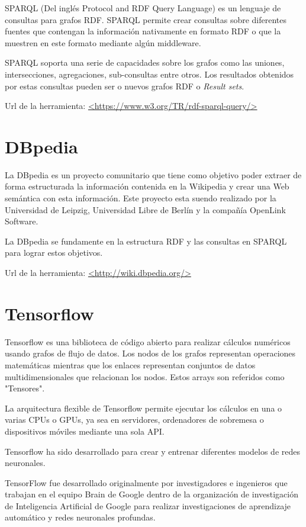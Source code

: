 SPARQL (Del inglés Protocol and RDF Query Language) es un lenguaje de consultas para grafos RDF. SPARQL permite crear consultas sobre diferentes fuentes que contengan la información nativamente en formato RDF o que la muestren en este formato mediante algún middleware.\cite{SPARQL}

SPARQL soporta una serie de capacidades sobre los grafos como las uniones, intersecciones, agregaciones, sub-consultas entre otros. Los resultados obtenidos por estas consultas pueden ser o nuevos grafos RDF o \textit{Result sets}.

Url de la herramienta: \url{<https://www.w3.org/TR/rdf-sparql-query/>}


\section{DBpedia}

La DBpedia es un proyecto comunitario que tiene como objetivo poder extraer de forma estructurada la información contenida en la Wikipedia y crear una Web semántica con esta información. Este proyecto esta suendo realizado por la Universidad de Leipzig, Universidad Libre de Berlín y la compañía OpenLink Software. \cite{wiki:DBpedia}

La DBpedia se fundamente en la estructura RDF y las consultas en SPARQL para lograr estos objetivos.

Url de la herramienta: \url{<http://wiki.dbpedia.org/>}

\section{Tensorflow}

Tensorflow es una biblioteca de código abierto para realizar cálculos numéricos usando grafos de flujo de datos. Los nodos de los grafos representan operaciones matemáticas mientras que los enlaces representan conjuntos de datos multidimensionales que relacionan los nodos. Estos arrays son referidos como "Tensores".\cite{wiki:Tensorflow}

La arquitectura flexible de Tensorflow permite ejecutar los cálculos en una o varias CPUs o GPUs, ya sea en servidores, ordenadores de sobremesa o dispositivos móviles mediante una sola API.

Tensorflow ha sido desarrollado para crear y entrenar diferentes modelos de redes neuronales.

TensorFlow fue desarrollado originalmente por investigadores e ingenieros que trabajan en el equipo Brain de Google dentro de la organización de investigación de Inteligencia Artificial de Google para realizar investigaciones de aprendizaje automático y redes neuronales profundas. 

